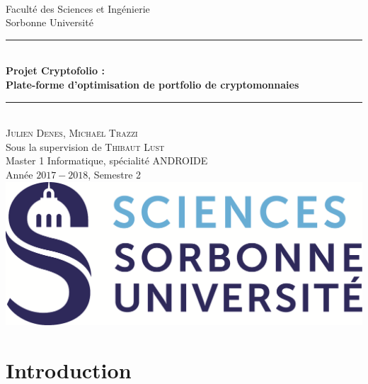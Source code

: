 \documentclass[a4paper, 10pt]{article}
\newcommand{\HRule}{\rule{\linewidth}{0.5mm}}
\begin{document}
\begin{titlepage}
\begin{center}
~\\[1cm]
\Large Faculté des Sciences et Ingénierie\\Sorbonne Université\\[3.5cm]
\HRule 
\\[0.4cm]{\huge \bfseries Projet Cryptofolio :\\[0.1cm] Plate-forme d’optimisation de portfolio de cryptomonnaies\\[0.4cm]}
\HRule \\[1cm] 
\Large \textsc{Julien Denes, Michaël Trazzi} \\[0.1cm]
\Large Sous la supervision de \textsc{Thibaut Lust}\\[2cm]
\Large Master 1 Informatique, spécialité ANDROIDE\\Année $2017-2018$, Semestre 2 \\[4cm]
\includegraphics[scale=0.3]{images/logo.png}
\end{center}
\end{titlepage}

\tableofcontents

\newpage
\section*{Introduction}
\label{sec:intro}
\end{document}
